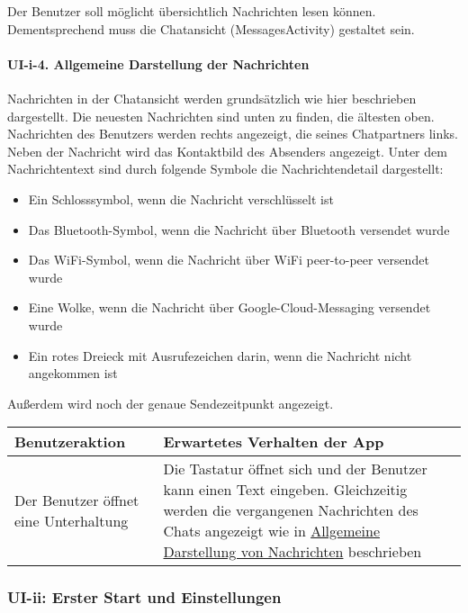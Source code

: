 Der Benutzer soll möglicht übersichtlich Nachrichten lesen können.
Dementsprechend muss die Chatansicht (MessagesActivity) gestaltet sein.

\paragraph{UI-i-4. Allgemeine Darstellung der
Nachrichten}\label{allgemeine-darstellung-der-nachrichten}

Nachrichten in der Chatansicht werden grundsätzlich wie hier beschrieben
dargestellt. Die neuesten Nachrichten sind unten zu finden, die ältesten
oben. Nachrichten des Benutzers werden rechts angezeigt, die seines
Chatpartners links. Neben der Nachricht wird das Kontaktbild des
Absenders angezeigt. Unter dem Nachrichtentext sind durch folgende
Symbole die Nachrichtendetail dargestellt:

\begin{itemize}
\tightlist
\item
  Ein Schlosssymbol, wenn die Nachricht verschlüsselt ist
\item
  Das Bluetooth-Symbol, wenn die Nachricht über Bluetooth versendet
  wurde
\item
  Das WiFi-Symbol, wenn die Nachricht über WiFi peer-to-peer versendet
  wurde
\item
  Eine Wolke, wenn die Nachricht über Google-Cloud-Messaging versendet
  wurde
\item
  Ein rotes Dreieck mit Ausrufezeichen darin, wenn die Nachricht nicht
  angekommen ist
\end{itemize}

Außerdem wird noch der genaue Sendezeitpunkt angezeigt.

\begin{longtable}{|p{8cm}|p{8.5cm}|}
\hline
Benutzeraktion & Erwartetes Verhalten der App\tabularnewline
\hline

Der Benutzer öffnet eine Unterhaltung & Die Tastatur öffnet sich und der
Benutzer kann einen Text eingeben. Gleichzeitig werden die vergangenen
Nachrichten des Chats angezeigt wie in
\href{Manueller-Test-UI\#allgemeine-darstellung-der-nachrichten}{Allgemeine
Darstellung von Nachrichten} beschrieben\tabularnewline
\hline
\end{longtable}



\clearpage
\subsubsection{UI-ii: Erster Start und
Einstellungen}\label{ii-erster-start-und-einstellungen}

